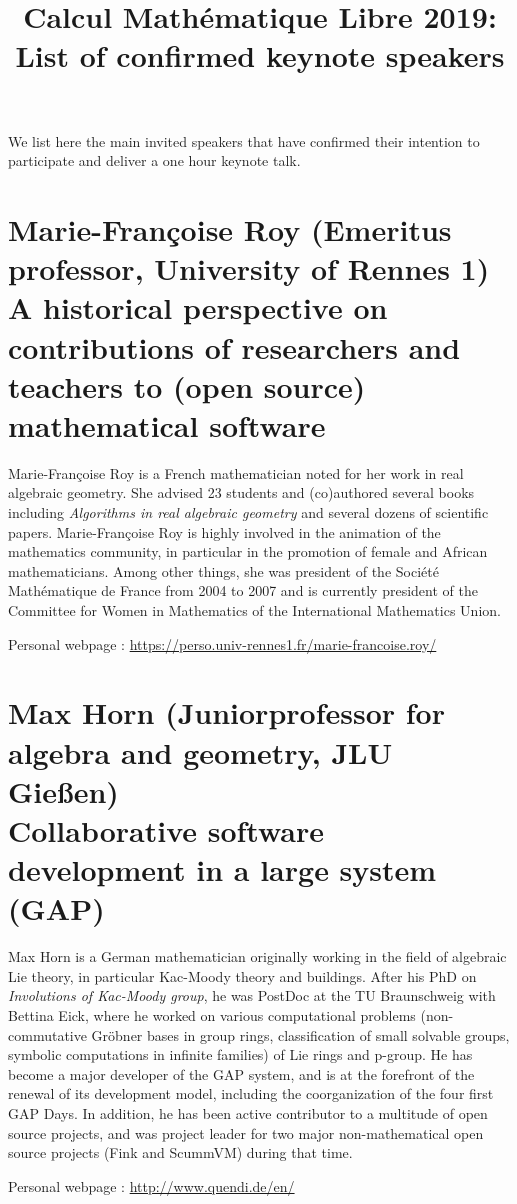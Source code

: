 \documentclass[12pt]{paper}
\title{Calcul Mathématique Libre 2019:\\ List of confirmed keynote speakers}
\date{}
\newcommand{\orateur}[3]{%
  \section*{%
    #1 {\small(#2)}\nopagebreak\\
    #3}
}
\begin{document}
\maketitle
\thispagestyle{empty}

We list here the main invited speakers that have confirmed their
intention to participate and deliver a one hour keynote talk.



\orateur
{Marie-Françoise Roy}
{Emeritus professor, University of Rennes 1}
{A historical perspective on contributions of researchers and teachers
  to (open source) mathematical software}

Marie-Françoise Roy is a French mathematician noted for her work in
real algebraic geometry. She advised 23 students and (co)authored
several books including \textit{Algorithms in real algebraic geometry} and
several dozens of scientific papers. Marie-Françoise Roy is highly
involved in the animation of the mathematics community, in particular
in the promotion of female and African mathematicians. Among other
things, she was president of the Société Mathématique de France from
2004 to 2007 and is currently president of the Committee for Women in
Mathematics of the International Mathematics Union.

Personal webpage : \url{https://perso.univ-rennes1.fr/marie-francoise.roy/}

\orateur
{Max Horn}
{Juniorprofessor for algebra and geometry, JLU Gießen}
{Collaborative software development in a large system (GAP)}
{
  Max Horn is a German mathematician originally working in the field of
  algebraic Lie theory, in particular Kac-Moody theory and buildings. After his
  PhD on \textit{Involutions of Kac-Moody group}, he was PostDoc at the TU
  Braunschweig with Bettina Eick, where he worked on various computational
  problems (non-commutative Gröbner bases in group rings, classification of
  small solvable groups, symbolic computations in infinite families) of Lie
  rings and p-group.
  He has become a major developer of the GAP system, and is at the
  forefront of the renewal of its development model, including the
  coorganization of the four first GAP Days.
  In addition, he has been active contributor to a multitude of open source
  projects, and was project leader for two major non-mathematical open source
  projects (Fink and ScummVM) during that time.

Personal webpage : \url{http://www.quendi.de/en/}
}
\end{document}

